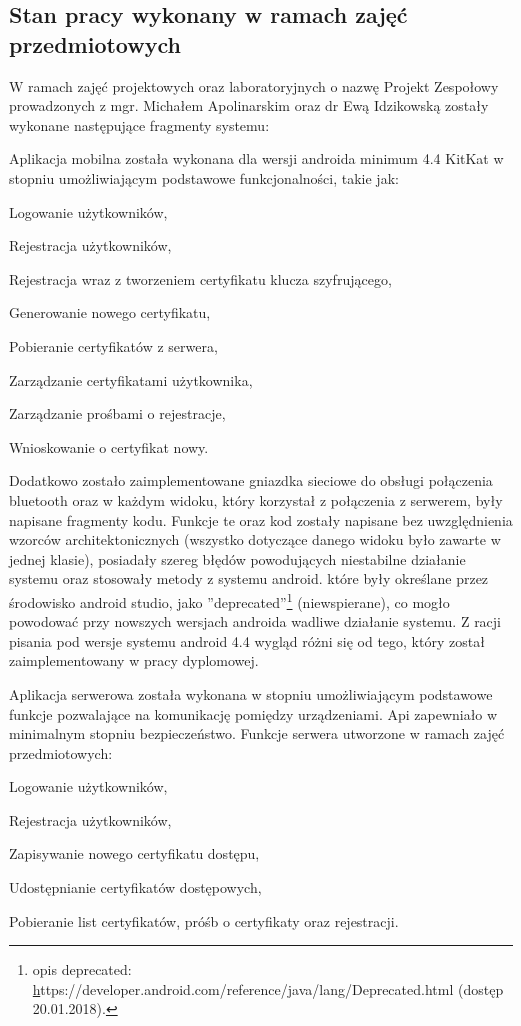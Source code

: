 \newpage
\subsection{Stan pracy wykonany w ramach zajęć \newline przedmiotowych} \label{sec:Stan pracy wykonany w ramach zajęć przedmiotowych}
W ramach zajęć projektowych oraz laboratoryjnych o nazwę Projekt Zespołowy prowadzonych z mgr. Michałem Apolinarskim oraz dr Ewą Idzikowską zostały wykonane następujące fragmenty systemu:
	
	Aplikacja mobilna została wykonana dla wersji androida minimum 4.4 KitKat w stopniu umożliwiającym podstawowe funkcjonalności, takie jak:
	\begin{itemize*}
		\item Logowanie użytkowników,
		\item Rejestracja użytkowników,
		\item Rejestracja wraz z tworzeniem certyfikatu klucza szyfrującego,
		\item Generowanie nowego certyfikatu,
		\item Pobieranie certyfikatów z serwera,
		\item Zarządzanie certyfikatami użytkownika,
		\item Zarządzanie prośbami o rejestracje,
		\item Wnioskowanie o certyfikat nowy.
	\end{itemize*}

		Dodatkowo zostało zaimplementowane gniazdka sieciowe do obsługi połączenia bluetooth oraz w każdym widoku, który korzystał z połączenia z serwerem, były napisane fragmenty kodu. Funkcje te oraz kod zostały napisane bez uwzględnienia wzorców architektonicznych (wszystko dotyczące danego widoku było zawarte w jednej klasie), posiadały szereg błędów powodujących niestabilne działanie systemu oraz stosowały metody z systemu android. które były określane przez środowisko android studio, jako ''deprecated''\footnote{opis deprecated: \hyperref[sec:trona internetowa z opiscem eprecated] https://developer.android.com/reference/java/lang/Deprecated.html (dostęp 20.01.2018).}  (niewspierane), co mogło powodować przy nowszych wersjach androida wadliwe działanie systemu. Z racji pisania pod wersje systemu android 4.4 wygląd różni się od tego, który został zaimplementowany w pracy dyplomowej.

   Aplikacja serwerowa została wykonana w stopniu umożliwiającym podstawowe funkcje pozwalające na komunikację pomiędzy urządzeniami. Api zapewniało w minimalnym stopniu bezpieczeństwo. Funkcje serwera utworzone w ramach zajęć przedmiotowych:
   	\begin{itemize*}
   		\item Logowanie użytkowników,
   		\item Rejestracja użytkowników,
   		\item Zapisywanie nowego certyfikatu dostępu,
   		\item Udostępnianie certyfikatów dostępowych,
   		\item Pobieranie list certyfikatów, próśb o certyfikaty oraz rejestracji.
   	\end{itemize*}
   
